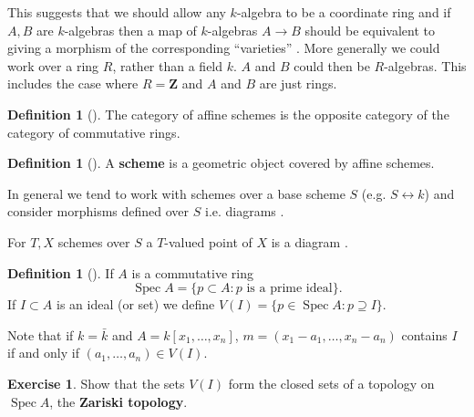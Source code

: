 \documentclass[10pt,]{book}
\newcommand{\terminology}[1]{\textbf{#1}}
\theoremstyle{plain}
\theoremstyle{definition}
\newtheorem{definition}[theorem]{Definition}
\newtheorem{exercise}[theorem]{Exercise}
\numberwithin{equation}{section}
\newcommand{\ZZ}{\mathbf{Z}}
\DeclareMathOperator{\Spec}{Spec}
\begin{document}
          This suggests that we should allow any \(k\)-algebra to be a coordinate ring and if \(A,B\) are \(k\)-algebras then a map of \(k\)-algebras \(A\to B\) should be equivalent to giving a morphism of the corresponding ``varieties'' .
          More generally we could work over a ring \(R\), rather than a field \(k\).
          \(A\) and \(B\) could then be \(R\)-algebras.
          This includes the case where \(R= \ZZ\) and \(A\) and \(B\) are just rings.
\begin{definition}[]\label{definition-1}
The category of affine schemes is the opposite category of the category of commutative rings.\end{definition}
\begin{definition}[]\label{definition-2}
A \terminology{scheme} is a geometric object covered by affine schemes.\end{definition}
\par
In general we tend to work with schemes over a base scheme \(S\) (e.g. \(S\leftrightarrow k\)) and consider morphisms defined over \(S\) i.e. diagrams .
        
        For \(T,X\) schemes over \(S\) a \(T\)-valued point of \(X\) is a diagram .%
\begin{definition}[]\label{definition-3}
If \(A\) is a commutative ring \[\Spec A = \{p\subset A : p \text{ is a prime ideal}\}.\]
            If \(I\subset A\) is an ideal (or set) we define \(V(I) = \{p\in \Spec A : p\supseteq I\}\).
          \end{definition}
\par
Note that if \(k = \bar{k}\) and \(A = k[x_1,\ldots,x_n]\), \(m = (x_1 - a_1,\ldots,x_n - a_n)\) contains \(I\) if and only if \((a_1,\ldots,a_n) \in V(I)\).%
\begin{exercise}\label{exercise-2}
Show that the sets \(V(I)\) form the closed sets of a topology on \(\Spec A\), the \terminology{Zariski topology}.\end{exercise}
\par
\end{document}
